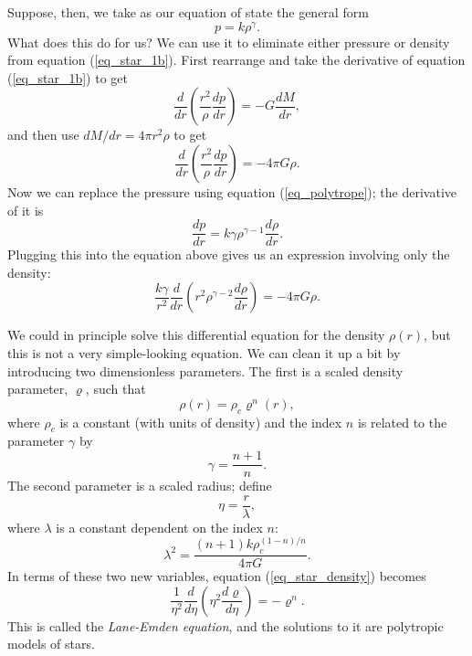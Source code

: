 Suppose, then, we take as our equation of state the general form
\begin{equation}
\label{eq_polytrope}
p = k \rho^\gamma.
\end{equation}
What does this do for us?  We can use it to eliminate either pressure or density from equation (\ref{eq_star_1b}).  First rearrange and take the derivative of equation (\ref{eq_star_1b}) to get
\[
\frac{d}{dr} \left( \frac{r^2}{\rho} \frac{dp}{dr} \right) = -G \frac{dM}{dr},
\]
and then use $dM/dr = 4\pi r^2 \rho$ to get
\[
\frac{d}{dr} \left( \frac{r^2}{\rho} \frac{dp}{dr} \right) = - 4 \pi G \rho.
\]
Now we can replace the pressure using equation (\ref{eq_polytrope}); the derivative of it is
\[
\frac{dp}{dr} = k \gamma \rho^{\gamma - 1} \frac{d\rho}{dr}.
\]
Plugging this into the equation above gives us an expression involving only the density:
\begin{equation}
\label{eq_star_density}
\frac{k\gamma}{r^2} \frac{d}{dr} \left( r^2 \rho^{\gamma - 2} \frac{d\rho}{dr} \right) = -4\pi G \rho.
\end{equation}

We could in principle solve this differential equation for the density $\rho(r)$, but this is not a very simple-looking equation.  We can clean it up a bit by introducing two dimensionless parameters.  The first is a scaled density parameter, $\varrho$, such that
\begin{equation}
\label{eq_varrho}
\rho(r) = \rho_c \varrho^n(r),
\end{equation}
where $\rho_c$ is a constant (with units of density) and the index $n$ is related to the parameter $\gamma$ by
\begin{equation}
\gamma = \frac{n+1}{n}.
\end{equation}
The second parameter is a scaled radius; define 
\begin{equation}
\eta = \frac{r}{\lambda},
\end{equation}
where $\lambda$ is a constant dependent on the index $n$:
\begin{equation}
\lambda^2 = \frac{(n+1) k \rho_c^{(1-n)/n}}{4\pi G}.
\end{equation}
In terms of these two new variables, equation (\ref{eq_star_density}) becomes
\begin{equation}
\boxed{
\frac{1}{\eta^2} \frac{d}{d\eta} \left( \eta^2 \frac{d\varrho}{d\eta} \right) = - \varrho^n.
}
\end{equation}
This is called the \emph{Lane-Emden equation}, and the solutions to it are polytropic models of stars.

